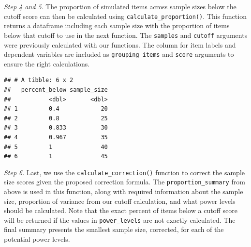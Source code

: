 \documentclass[
  man]{apa7}
\newenvironment{Shaded}{\begin{snugshade}}{\end{snugshade}}
\newcommand{\AttributeTok}[1]{\textcolor[rgb]{0.13,0.29,0.53}{#1}}
\newcommand{\CommentTok}[1]{\textcolor[rgb]{0.56,0.35,0.01}{\textit{#1}}}
\newcommand{\FunctionTok}[1]{\textcolor[rgb]{0.13,0.29,0.53}{\textbf{#1}}}
\newcommand{\NormalTok}[1]{#1}
\newcommand{\OtherTok}[1]{\textcolor[rgb]{0.56,0.35,0.01}{#1}}
\newcommand{\SpecialCharTok}[1]{\textcolor[rgb]{0.81,0.36,0.00}{\textbf{#1}}}
\newcommand{\StringTok}[1]{\textcolor[rgb]{0.31,0.60,0.02}{#1}}
\begin{document}
\emph{Step 4 and 5}. The proportion of simulated items across sample sizes below the cutoff score can then be calculated using \texttt{calculate\_proportion()}. This function returns a dataframe including each sample size with the proportion of items below that cutoff to use in the next function. The \texttt{samples} and \texttt{cutoff} arguments were previously calculated with our functions. The column for item labels and dependent variables are included as \texttt{grouping\_items} and \texttt{score} arguments to ensure the right calculations.

\begin{Shaded}
\end{Shaded}

\begin{verbatim}
## # A tibble: 6 x 2
##   percent_below sample_size
##           <dbl>       <dbl>
## 1         0.4            20
## 2         0.8            25
## 3         0.833          30
## 4         0.967          35
## 5         1              40
## 6         1              45
\end{verbatim}

\emph{Step 6}. Last, we use the \texttt{calculate\_correction()} function to correct the sample size scores given the proposed correction formula. The \texttt{proportion\_summary} from above is used in this function, along with required information about the sample size, proportion of variance from our cutoff calculation, and what power levels should be calculated. Note that the exact percent of items below a cutoff score will be returned if the values in \texttt{power\_levels} are not exactly calculated. The final summary presents the smallest sample size, corrected, for each of the potential power levels.
\end{document}
